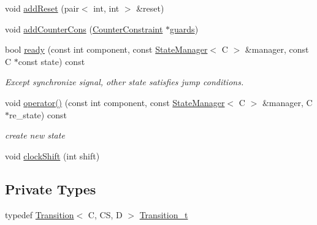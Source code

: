 \begin{DoxyCompactItemize}
\item 
void \mbox{\hyperlink{classgraphsat_1_1_transition_ad406304a7c8d3ffad38c0f1578ef6e31}{add\+Reset}} (pair$<$ int, int $>$ \&reset)
\item 
void \mbox{\hyperlink{classgraphsat_1_1_transition_af5e1f394f7a4c0bcdf416d28b8b8f9fb}{add\+Counter\+Cons}} (\mbox{\hyperlink{classgraphsat_1_1_counter_constraint}{Counter\+Constraint}} $\ast$\mbox{\hyperlink{classgraphsat_1_1_transition_a09145e27f96327f8e520d89493491371}{guards}})
\item 
bool \mbox{\hyperlink{classgraphsat_1_1_transition_a7ec1d0635ddfce028810457db91c3059}{ready}} (const int component, const \mbox{\hyperlink{classgraphsat_1_1_state_manager}{State\+Manager}}$<$ C $>$ \&manager, const C $\ast$const state) const
\begin{DoxyCompactList}\small\item\em Except synchronize signal, other state satisfies jump conditions. \end{DoxyCompactList}\item 
void \mbox{\hyperlink{classgraphsat_1_1_transition_a9bca78149ee938dd36cb856538ce81f0}{operator()}} (const int component, const \mbox{\hyperlink{classgraphsat_1_1_state_manager}{State\+Manager}}$<$ C $>$ \&manager, C $\ast$re\+\_\+state) const
\begin{DoxyCompactList}\small\item\em create new state \end{DoxyCompactList}\item 
void \mbox{\hyperlink{classgraphsat_1_1_transition_ac489a29696f5620486df69e36ae3b2b3}{clock\+Shift}} (int shift)
\end{DoxyCompactItemize}
\subsection*{Private Types}
\begin{DoxyCompactItemize}
\item 
typedef \mbox{\hyperlink{classgraphsat_1_1_transition}{Transition}}$<$ C, CS, D $>$ \mbox{\hyperlink{classgraphsat_1_1_transition_ae0650c39cf272493d16d1fd1b01b6075}{Transition\+\_\+t}}
\end{DoxyCompactItemize}
